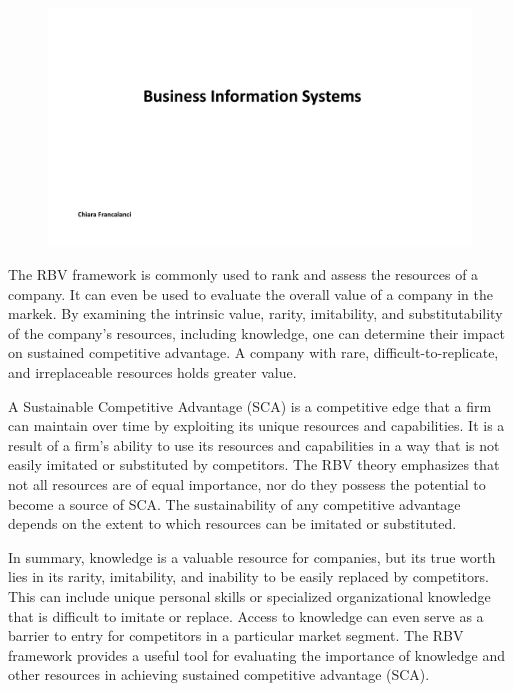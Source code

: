 \begin{figure}[!h]
  \centering
  \includegraphics[page=7, trim = 1.5cm 2cm 1.5cm 3cm, clip, width=\imagewidth]{images/05 - KM.pdf}
\end{figure}

The RBV framework is commonly used to rank and assess the resources of a
company. It can even be used to evaluate the overall value of a company
in the markek. By examining the intrinsic value, rarity, imitability,
and substitutability of the company's resources, including knowledge,
one can determine their impact on sustained competitive advantage. A
company with rare, difficult-to-replicate, and irreplaceable resources
holds greater value.

A Sustainable Competitive Advantage (SCA) is a competitive edge that a firm can maintain over time by exploiting its unique resources and capabilities. It is a result of a firm's ability to use its resources and capabilities in a way that is not easily imitated or substituted by competitors. The RBV theory emphasizes that not all resources are of equal importance, nor do they possess the potential to become a source of SCA. The sustainability of any competitive advantage depends on the extent to which resources can be imitated or substituted.

In summary, knowledge is a valuable resource for companies, but its true
worth lies in its rarity, imitability, and inability to be easily
replaced by competitors. This can include unique
personal skills or specialized organizational knowledge that is
difficult to imitate or replace. Access to knowledge can even serve as a
barrier to entry for competitors in a particular market segment. The RBV framework provides a useful tool for evaluating the importance of knowledge and other resources in achieving
sustained competitive advantage (SCA).

